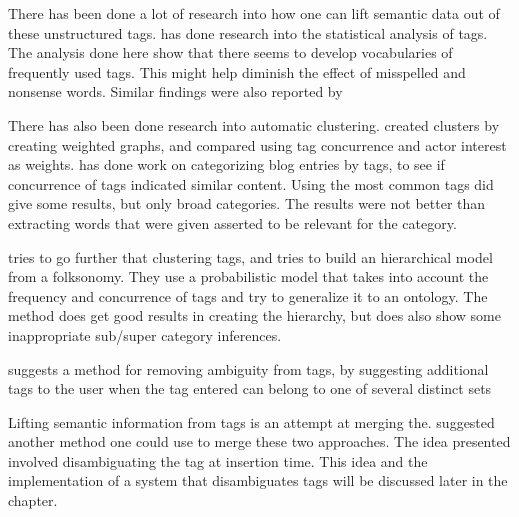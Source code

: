 There has been done a lot of research into how one can lift semantic data out of these unstructured tags.
\citet{Golder2005} has done research into the statistical analysis of tags.
The analysis done here show that there seems to develop vocabularies of frequently used tags.
This might help diminish the effect of misspelled and nonsense words. Similar findings were also reported by \citep{Shirky2007}

There has also been done research into automatic clustering.
\citet{Mika2005} created clusters by creating weighted graphs, and compared using tag concurrence and actor interest as weights.
\citet{Brooks2006} has done work on categorizing blog entries by tags, to see if concurrence of tags indicated similar content.
Using the most common tags did give some results, but only broad categories. The results were not better than extracting words that were given asserted to be relevant for the category.

\citep{Tang2009} tries to go further that clustering tags, and tries to build an hierarchical model from a folksonomy.
They use a probabilistic model that takes into account the frequency and concurrence of tags and try to generalize it to an ontology.
The method does get good results in creating the hierarchy, but does also show some inappropriate sub/super category inferences.

\citet{Weinberger2008} suggests a method for removing ambiguity from tags,
 by suggesting additional tags to the user when the tag entered can belong to one of several distinct sets

Lifting semantic information from tags is an attempt at merging the.
\citet{Veres2011} suggested another method one could use to merge these two approaches.
The idea presented involved disambiguating the tag at insertion time.
This idea and the implementation of a system that disambiguates tags will be discussed later in the chapter.

